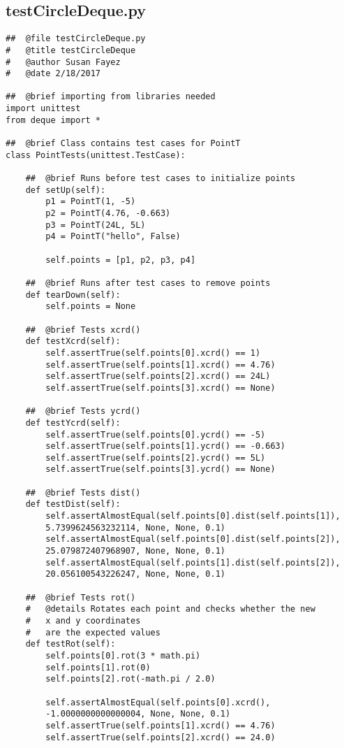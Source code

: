 \documentclass{article}
\begin{document}
\subsection{testCircleDeque.py}
\begin{lstlisting}
##  @file testCircleDeque.py
#   @title testCircleDeque
#   @author Susan Fayez
#   @date 2/18/2017

##  @brief importing from libraries needed
import unittest
from deque import *

##  @brief Class contains test cases for PointT
class PointTests(unittest.TestCase):

    ##  @brief Runs before test cases to initialize points
    def setUp(self):
        p1 = PointT(1, -5)
        p2 = PointT(4.76, -0.663)
        p3 = PointT(24L, 5L)
        p4 = PointT("hello", False)

        self.points = [p1, p2, p3, p4]

    ##  @brief Runs after test cases to remove points
    def tearDown(self):
        self.points = None
        
    ##  @brief Tests xcrd()
    def testXcrd(self):
        self.assertTrue(self.points[0].xcrd() == 1)
        self.assertTrue(self.points[1].xcrd() == 4.76)
        self.assertTrue(self.points[2].xcrd() == 24L)
        self.assertTrue(self.points[3].xcrd() == None)     
        
    ##  @brief Tests ycrd()
    def testYcrd(self):
        self.assertTrue(self.points[0].ycrd() == -5)
        self.assertTrue(self.points[1].ycrd() == -0.663)
        self.assertTrue(self.points[2].ycrd() == 5L)
        self.assertTrue(self.points[3].ycrd() == None)
          
    ##  @brief Tests dist()
    def testDist(self):
        self.assertAlmostEqual(self.points[0].dist(self.points[1]), 
        5.7399624563232114, None, None, 0.1)
        self.assertAlmostEqual(self.points[0].dist(self.points[2]), 
        25.079872407968907, None, None, 0.1)
        self.assertAlmostEqual(self.points[1].dist(self.points[2]), 
        20.056100543226247, None, None, 0.1)
   
    ##  @brief Tests rot()
    #   @details Rotates each point and checks whether the new 
    #   x and y coordinates
    #   are the expected values
    def testRot(self):
        self.points[0].rot(3 * math.pi)
        self.points[1].rot(0)
        self.points[2].rot(-math.pi / 2.0)

        self.assertAlmostEqual(self.points[0].xcrd(), 
        -1.0000000000000004, None, None, 0.1)
        self.assertTrue(self.points[1].xcrd() == 4.76)
        self.assertTrue(self.points[2].xcrd() == 24.0)
      

\end{lstlisting}
\end{document}
